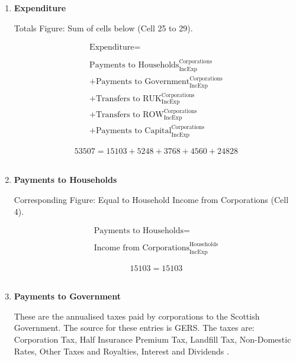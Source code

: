 \begin{enumerate}
\newpage


\item \textbf {Expenditure}

Totals Figure: Sum of cells below (Cell 25 to 29).

\begin{equation}
\begin{split}
\text{Expenditure} =  \\ \\
\text{Payments to Households}^\text{Corporations}_\text{IncExp}\\
+\text{Payments to Government}^\text{Corporations}_\text{IncExp}\\
+\text{Transfers to RUK}^\text{Corporations}_\text{IncExp}\\
+\text{Transfers to ROW}^\text{Corporations}_\text{IncExp}\\
+\text{Payments to Capital}^\text{Corporations}_\text{IncExp}
\end{split} \label{eq:2.5.28}
\end{equation}

\begin{equation} \nonumber
53507 = 15103+5248+3768+4560+24828
\end{equation}\\


\item \textbf {Payments to Households}

Corresponding Figure: Equal to Household Income from Corporations (Cell 4).

\begin{equation}
\begin{split}
\text{Payments to Households} =  \\ \\
\text{Income from Corporations}^\text{Households}_\text{IncExp}
\end{split} \label{eq:2.5.29}
\end{equation}

\begin{equation} \nonumber
15103 = 15103
\end{equation}\\

\newpage

\item \textbf {Payments to Government}

These are the annualised taxes paid by corporations to the Scottish Government. The source for these entries is GERS. The taxes are: Corporation Tax, Half Insurance Premium Tax, Landfill Tax, Non-Domestic Rates, Other Taxes and Royalties, Interest and Dividends \cite{ScotGov2013b}.


\end{enumerate}
